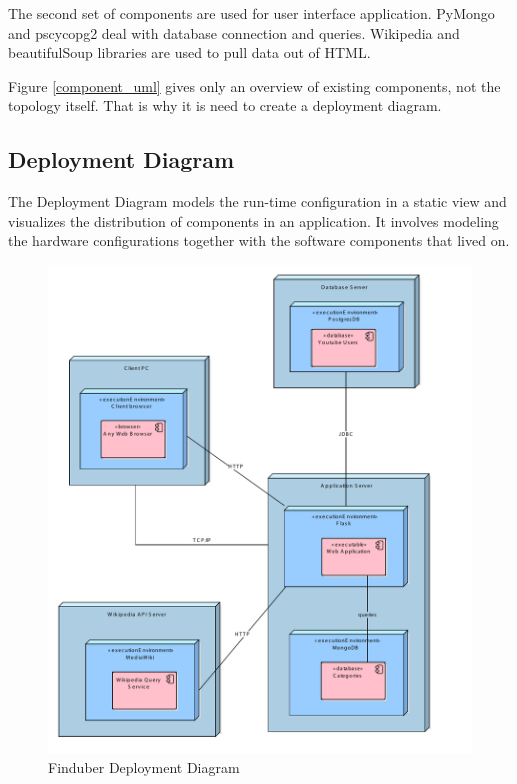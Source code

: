 The second set of components are used for user interface application. PyMongo and pscycopg2 deal with database connection and queries. Wikipedia and beautifulSoup libraries are used to pull data out of HTML. 

Figure \ref{component_uml} gives only an overview of existing components, not the topology itself. That is why it is need to create a deployment diagram. 

\subsection{Deployment Diagram}

The Deployment Diagram models the run-time configuration in a static view and visualizes the distribution of components in an application. It involves modeling the hardware configurations together with the software components that lived on.

\begin{figure}[!ht]
\centering
\includegraphics[width=15cm]{Deployment}
\caption{Finduber Deployment Diagram}\label{deploy_uml}
\end{figure}

